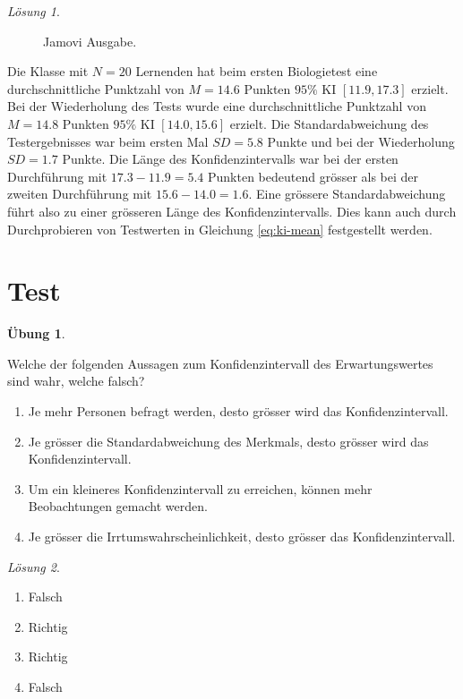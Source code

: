 \documentclass[
]{book}
\providecommand{\tightlist}{%
  \setlength{\itemsep}{0pt}\setlength{\parskip}{0pt}}
\theoremstyle{definition}
\theoremstyle{definition}
\theoremstyle{definition}
\newtheorem{exercise}{Übung}[chapter]
\theoremstyle{definition}
\theoremstyle{remark}
\newtheorem*{solution}{Lösung}
\begin{document}
\begin{solution}
\begin{figure}
{}

\caption{Jamovi Ausgabe.}\label{fig:sol-biologietest-output}
\end{figure}

Die Klasse mit \(N=20\) Lernenden hat beim ersten Biologietest eine durchschnittliche Punktzahl von \(M=14.6\) Punkten \(95\%\) KI \([11.9,17.3]\) erzielt. Bei der Wiederholung des Tests wurde eine durchschnittliche Punktzahl von \(M=14.8\) Punkten \(95\%\) KI \([14.0,15.6]\) erzielt. Die Standardabweichung des Testergebnisses war beim ersten Mal \(SD=5.8\) Punkte und bei der Wiederholung \(SD=1.7\) Punkte. Die Länge des Konfidenzintervalls war bei der ersten Durchführung mit \(17.3-11.9=5.4\) Punkten bedeutend grösser als bei der zweiten Durchführung mit \(15.6-14.0=1.6\). Eine grössere Standardabweichung führt also zu einer grösseren Länge des Konfidenzintervalls. Dies kann auch durch Durchprobieren von Testwerten in Gleichung \eqref{eq:ki-mean} festgestellt werden.
\end{solution}

\section{Test}\label{test-1}

\begin{exercise}
\protect\hypertarget{exr:ki-theory}{}\label{exr:ki-theory}

Welche der folgenden Aussagen zum Konfidenzintervall des Erwartungswertes sind wahr, welche falsch?

\begin{enumerate}
\def\labelenumi{\alph{enumi})}
\tightlist
\item
  Je mehr Personen befragt werden, desto grösser wird das Konfidenzintervall.
\item
  Je grösser die Standardabweichung des Merkmals, desto grösser wird das Konfidenzintervall.
\item
  Um ein kleineres Konfidenzintervall zu erreichen, können mehr Beobachtungen gemacht werden.
\item
  Je grösser die Irrtumswahrscheinlichkeit, desto grösser das Konfidenzintervall.
\end{enumerate}

\end{exercise}

\begin{solution}
\leavevmode

\begin{enumerate}
\def\labelenumi{\alph{enumi})}
\tightlist
\item
  Falsch
\item
  Richtig
\item
  Richtig
\item
  Falsch
\end{enumerate}

\end{solution}
\end{document}
